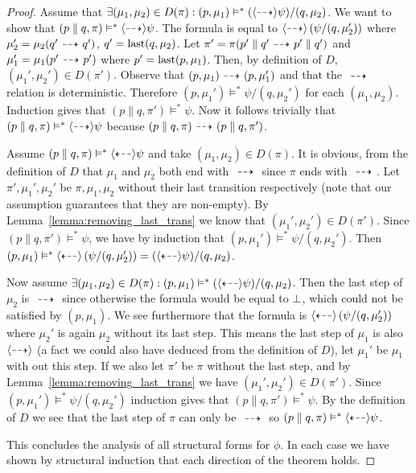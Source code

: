 \begin{proof}
    \rtl Assume that $\exists (\mu_1,\mu_2) \in D(\pi) : (p,\mu_1) \vDash^* (\mbox{\ensuremath{\langle\stackrel{_{}}{\dashrightarrow}\rangle}}
    \psi)/(q,\mu_2)$. 
    We want to show that $(p\parallel q,\pi) \vDash^* \mbox{\ensuremath{\langle\stackrel{_{}}{\dashrightarrow}\rangle}}\psi$.
    The formula is equal to $\mbox{\ensuremath{\langle\stackrel{_{}}{\dashrightarrow}\rangle}} \left( \psi / (q,\mu_2') \right)$
    where $\mu_2' = \mu_2(q' \ {\stackrel{_{}}{\dashrightarrow}}\  q')$, $q' = \operatorname{last}(q,\mu_2)$. Let $\pi' = \pi
    (p'\parallel q' \ {\stackrel{_{}}{\dashrightarrow}}\  p'\parallel q')$ and $\mu_1' = \mu_1(p'\ {\stackrel{_{}}{\dashrightarrow}}\  p')$
    where $p' = \operatorname{last}(p,\mu_1)$. Then, by definition of $D$, $(\mu_1',\mu_2') \in D(\pi')$.
    Observe that $(p,\mu_1)\ {\stackrel{_{}}{\dashrightarrow}}\ (p,\mu_1')$ and that the $\ {\stackrel{_{}}{\dashrightarrow}}\ $ relation
    is deterministic. Therefore
    $(p,\mu_1')\vDash^* \psi/(q,\mu_2')$ for each $(\mu_1,\mu_2)$. 
    Induction gives that $(p\parallel q, \pi')
    \vDash^* \psi$. Now it follows trivially that $(p\parallel q,\pi) \vDash^* \mbox{\ensuremath{\langle\stackrel{_{}}{\dashrightarrow}\rangle}}
    \psi$ because $(p\parallel q, \pi)\ {\stackrel{_{}}{\dashrightarrow}}\ (p\parallel q, \pi')$.


    \par\nobreak
    \ltr Assume $(p\parallel q, \pi) \vDash^* \mbox{\ensuremath{\langle\stackrel{_{}}{\dashleftarrow}\rangle}}\psi$ and take $(\mu_1,\mu_2)
    \in D(\pi)$. It is obvious, from the definition of $D$ that $\mu_1$ and $\mu_2$ both
    end with $\ {\stackrel{_{}}{\dashrightarrow}}\ $ since $\pi$ ends with $\ {\stackrel{_{}}{\dashrightarrow}}\ $. Let $\pi', \mu_1', \mu_2'$
    be $\pi,\mu_1,\mu_2$ without their last transition respectively (note that our assumption
    guarantees that they are non-empty). By Lemma~\ref{lemma:removing_last_trans} we know
    that $(\mu_1',\mu_2') \in D(\pi')$. Since $(p\parallel q,\pi') \vDash^* \psi$, we have
    by induction that $(p,\mu_1')\vDash^* \psi/(q,\mu_2')$. Then $(p,\mu_1)\vDash^*
    \mbox{\ensuremath{\langle\stackrel{_{}}{\dashleftarrow}\rangle}} \left( \psi/(q,\mu_2') \right) = (\mbox{\ensuremath{\langle\stackrel{_{}}{\dashleftarrow}\rangle}}\psi)/(q,\mu_2)$.

    \rtl Now assume $\exists (\mu_1,\mu_2) \in D(\pi) : (p,\mu_1) \vDash^* (\mbox{\ensuremath{\langle\stackrel{_{}}{\dashleftarrow}\rangle}}
    \psi)/(q,\mu_2)$. Then the last step of $\mu_2$ is $\ {\stackrel{_{}}{\dashrightarrow}}\ $ since otherwise
    the formula would be equal to $\bot$, which could not be satisfied by $(p,\mu_1)$.
    We see furthermore that the formula is $\mbox{\ensuremath{\langle\stackrel{_{}}{\dashleftarrow}\rangle}}\left(\psi/(q,\mu_2')\right)$ where
    $\mu_2'$ is again $\mu_2$ without its last step. This means the last step of $\mu_1$
    is also $\mbox{\ensuremath{\langle\stackrel{_{}}{\dashrightarrow}\rangle}}$ (a fact we could also have deduced from the definition of $D$),
    let $\mu_1'$ be $\mu_1$ with out this step. If we also let $\pi'$ be $\pi$ without the
    last step, and by Lemma~\ref{lemma:removing_last_trans} we have
    $(\mu_1',\mu_2')\in D(\pi')$. Since
    $(p,\mu_1')\vDash^* \psi/(q,\mu_2')$ induction gives that $(p\parallel q,\pi')\vDash^*
    \psi$. By the definition of $D$ we see that the last step of $\pi$ can only be $\ {\stackrel{_{}}{\dashrightarrow}}\ $
    so $(p\parallel q, \pi)\vDash^* \mbox{\ensuremath{\langle\stackrel{_{}}{\dashleftarrow}\rangle}} \psi$.

    \vspace{1em}

    This concludes the analysis of all structural forms for $\phi$. In each case we have
    shown by structural induction that each direction of the theorem holds.
\end{proof}

